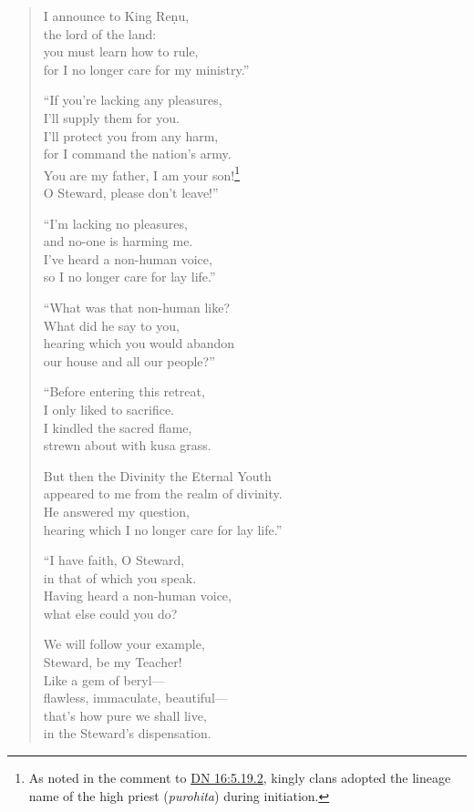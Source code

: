 \documentclass[12pt,openany]{book}%
\begin{document}
\begin{verse}%
I announce to King \textsanskrit{Reṇu}, \\
the lord of the land: \\
you must learn how to rule, \\
for I no longer care for my ministry.” 

“If you’re lacking any pleasures, \\
I’ll supply them for you. \\
I’ll protect you from any harm, \\
for I command the nation’s army. \\
You are my father, I am your son!\footnote{As noted in the comment to \href{https://suttacentral.net/dn16/en/sujato\#5.19.2}{DN 16:5.19.2}, kingly clans adopted the lineage name of the high priest (\textit{purohita}) during initiation. } \\
O Steward, please don’t leave!” 

“I’m lacking no pleasures, \\
and no-one is harming me. \\
I’ve heard a non-human voice, \\
so I no longer care for lay life.” 

“What was that non-human like? \\
What did he say to you, \\
hearing which you would abandon \\
our house and all our people?” 

“Before entering this retreat, \\
I only liked to sacrifice. \\
I kindled the sacred flame, \\
strewn about with kusa grass. 

But then the Divinity the Eternal Youth \\
appeared to me from the realm of divinity. \\
He answered my question, \\
hearing which I no longer care for lay life.” 

“I have faith, O Steward, \\
in that of which you speak. \\
Having heard a non-human voice, \\
what else could you do? 

We will follow your example, \\
Steward, be my Teacher! \\
Like a gem of beryl—\\
flawless, immaculate, beautiful—\\
that’s how pure we shall live, \\
in the Steward’s dispensation. 

%
\end{verse}
\end{document}
